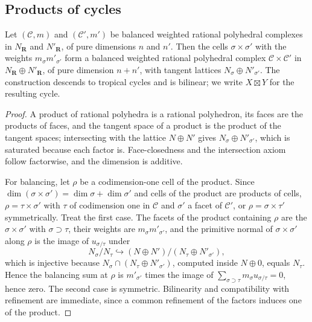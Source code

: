\subsection{Products of cycles}

\begin{proposition}
\label{prop:ch10-product-cycle}
Let $(\mathscr C,m)$ and $(\mathscr C',m')$ be balanced weighted rational
polyhedral complexes in $N_{\mathbf R}$ and $N'_{\mathbf R}$, of pure
dimensions $n$ and $n'$.  Then the cells $\sigma\times\sigma'$ with the
weights $m_\sigma m'_{\sigma'}$ form a balanced weighted rational polyhedral
complex $\mathscr C\times\mathscr C'$ in $N_{\mathbf R}\oplus
N'_{\mathbf R}$, of pure dimension $n+n'$, with tangent lattices
$N_{\sigma}\oplus N'_{\sigma'}$.  The construction descends to tropical
cycles and is bilinear; we write $X\boxtimes Y$ for the resulting cycle.
\end{proposition}

\begin{proof}
A product of rational polyhedra is a rational polyhedron, its faces are the
products of faces, and the tangent space of a product is the product of the
tangent spaces; intersecting with the lattice $N\oplus N'$ gives
$N_\sigma\oplus N'_{\sigma'}$, which is saturated because each factor is.
Face-closedness and the intersection axiom follow factorwise, and the
dimension is additive.

For balancing, let $\rho$ be a codimension-one cell of the product.  Since
$\dim(\sigma\times\sigma')=\dim\sigma+\dim\sigma'$ and cells of the product
are products of cells, $\rho=\tau\times\sigma'$ with $\tau$ of codimension
one in $\mathscr C$ and $\sigma'$ a facet of $\mathscr C'$, or
$\rho=\sigma\times\tau'$ symmetrically.  Treat the first case.  The facets of
the product containing $\rho$ are the $\sigma\times\sigma'$ with
$\sigma\supset\tau$, their weights are $m_\sigma m'_{\sigma'}$, and the
primitive normal of $\sigma\times\sigma'$ along $\rho$ is the image of
$u_{\sigma/\tau}$ under
\[
 N_\sigma/N_\tau
 \hookrightarrow
 (N\oplus N')/(N_\tau\oplus N'_{\sigma'}),
\]
which is injective because $N_\sigma\cap(N_\tau\oplus N'_{\sigma'})$, computed
inside $N\oplus 0$, equals $N_\tau$.  Hence the balancing sum at $\rho$ is
$m'_{\sigma'}$ times the image of $\sum_{\sigma\supset\tau}m_\sigma
u_{\sigma/\tau}=0$, hence zero.  The second case is symmetric.  Bilinearity
and compatibility with refinement are immediate, since a common refinement of
the factors induces one of the product.
\end{proof}

